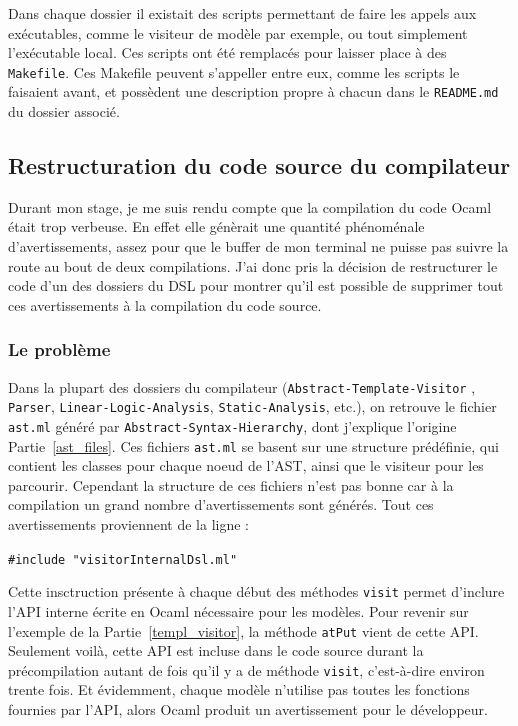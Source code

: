 Dans chaque dossier il existait des scripts permettant de faire les appels aux 
exécutables, comme le visiteur de modèle par exemple, ou tout simplement 
l'exécutable local. Ces scripts ont été remplacés pour laisser place à des 
\texttt{Makefile}. Ces Makefile peuvent s'appeller entre eux, comme les scripts 
le faisaient avant, et possèdent une description propre à chacun dans le \texttt
{README.md} du dossier associé.

\subsection{Restructuration du code source du compilateur} 
\label{warnings}

Durant mon stage, je me suis rendu compte que la compilation du code Ocaml 
était trop verbeuse. En effet elle génèrait une quantité phénoménale 
d'avertissements, assez pour que le buffer de mon terminal ne puisse pas suivre 
la route au bout de deux compilations. J'ai donc pris la décision de 
restructurer le code d'un des dossiers du DSL pour montrer qu'il est possible 
de supprimer tout ces avertissements à la compilation du code source.

\subsubsection{Le problème}

Dans la plupart des dossiers du compilateur (\texttt{Abstract-Template-Visitor}
, \texttt{Parser}, \texttt{Linear-Logic-Analysis}, \texttt{Static-Analysis}, 
etc.), on retrouve le fichier \texttt{ast.ml} généré par \texttt
{Abstract-Syntax-Hierarchy}, dont j'explique l'origine Partie~\ref{ast_files}. 
Ces fichiers \texttt{ast.ml} se basent sur une structure prédéfinie, qui 
contient les classes pour chaque noeud de l'AST, ainsi que le visiteur pour les 
parcourir. Cependant la structure de ces fichiers n'est pas bonne car à la 
compilation un grand nombre d'avertissements sont générés. Tout ces 
avertissements proviennent de la ligne :

\vspace{3mm}
\texttt{\#include "visitorInternalDsl.ml"}
\vspace{3mm}

Cette insctruction présente à chaque début des méthodes \texttt{visit} permet 
d'inclure l'API interne écrite en Ocaml nécessaire pour les modèles. Pour 
revenir sur l'exemple de la Partie~\ref{templ_visitor}, la méthode \texttt
{atPut} vient de cette API. Seulement voilà, cette API est incluse dans le code 
source durant la précompilation autant de fois qu'il y a de méthode \texttt
{visit}, c'est-à-dire environ trente fois. Et évidemment, chaque modèle 
n'utilise pas toutes les fonctions fournies par l'API, alors Ocaml produit un 
avertissement pour le développeur.

